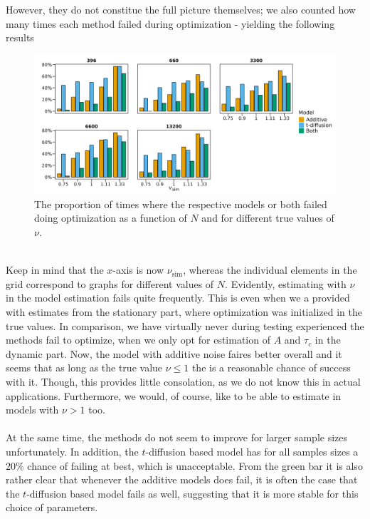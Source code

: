 \newpage 
\noindent However, they do not constitue the full picture themselves; we also counted how many times each method failed during optimization - yielding the following results
\begin{figure}[h!]
    \begin{center}
        \includegraphics[scale = .1]{figures/error_count_plot.jpeg}
        \caption{The proportion of times where the respective models or both failed doing optimization as a function of $N$ and for different true values of $\nu$.}
        \label{figure:error_count_nu_experiment}
    \end{center}
\end{figure}\\
Keep in mind that the $x$-axis is now $\nu_{\mathrm{sim}}$, whereas the individual elements in the grid correspond to graphs for different values of $N$. Evidently, estimating with $\nu$ in the model estimation fails quite frequently. This is even when we a provided with estimates from the stationary part, where optimization was initialized in the true values. In comparison, we have virtually never during testing experienced the methods fail to optimize, when we only opt for estimation of $A$ and $\tau_c$ in the dynamic part. Now, the model with additive noise faires better overall and it seems that as long as the true value $\nu\leq 1$ the is a reasonable chance of success with it. Though, this provides little consolation, as we do not know this in actual applications. Furthermore, we would, of course, like to be able to estimate in models with $\nu > 1$ too.\\\\
At the same time, the methods do not seem to improve for larger sample sizes unfortunately. In addition, the $t$-diffusion based model has for all samples sizes a $20\%$ chance of failing at best, which is unacceptable. From the green bar it is also rather clear that whenever the additive models does fail, it is often the case that the $t$-diffusion based model fails as well, suggesting that it is more stable for this choice of parameters.  
